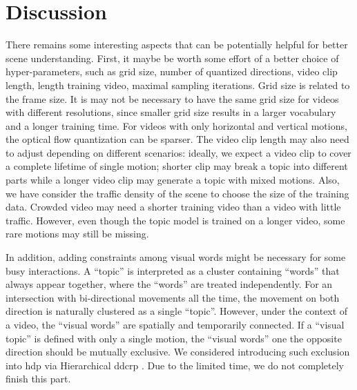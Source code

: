 \section{Discussion}

There remains some interesting aspects that can be potentially helpful for better scene understanding.
First, it maybe be worth some effort of a better choice of hyper-parameters, such as grid size, number of quantized directions, video clip length, length training video, maximal sampling iterations.
Grid size is related to the frame size. It is may not be necessary to have the same grid size for videos with different resolutions, since smaller grid size results in a larger vocabulary and a longer training time.
For videos with only horizontal and vertical motions, the optical flow quantization can be sparser. 
The video clip length may also need to adjust depending on different scenarios: ideally, we expect a video clip to cover a complete lifetime of single motion; shorter clip may break a topic into different parts while a longer video clip may generate a topic with mixed motions. 
Also, we have consider the traffic density of the scene to choose the size of the training data. Crowded video may need a shorter training video than a video with little traffic.
However, even though the topic model is trained on a longer video, some rare motions may still be missing.

In addition, adding constraints among visual words might be necessary for some busy interactions. 
A ``topic'' is interpreted as a cluster containing ``words'' that always appear together, where the ``words'' are treated independently.
For an intersection with bi-directional movements all the time, the movement on both direction is naturally clustered as a single ``topic''. 
However, under the context of a video, the ``visual words'' are spatially and temporarily connected. 
If a ``visual topic'' is defined with only a single motion, the ``visual words'' one the opposite direction should be mutually exclusive.
We considered introducing such exclusion into \gls{hdp} via Hierarchical \gls{ddcrp} \cite{blei2011distance}.
Due to the limited time, we do not completely finish this part.